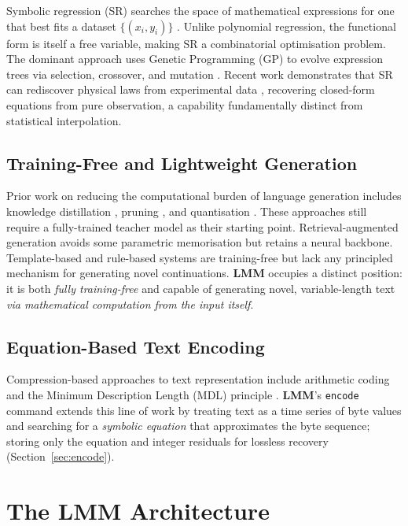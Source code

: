 \documentclass[11pt,a4paper]{article}
\newcommand{\lmm}{\texorpdfstring{%
  \textbf{\color{lmmAccent}LMM}}{LMM}}
\begin{document}
Symbolic regression (SR) searches the space of mathematical expressions for one that best fits a dataset $\{(x_i, y_i)\}$ \citep{koza1992genetic}. Unlike polynomial regression, the functional form is itself a free variable, making SR a combinatorial optimisation problem. The dominant approach uses Genetic Programming (GP) to evolve expression trees via selection, crossover, and mutation \citep{koza1992genetic,schmidt2009distilling}. Recent work demonstrates that SR can rediscover physical laws from experimental data \citep{udrescu2020ai,cranmer2020discovering}, recovering closed-form equations from pure observation, a capability fundamentally distinct from statistical interpolation.

\subsection{Training-Free and Lightweight Generation}

Prior work on reducing the computational burden of language generation includes knowledge distillation \citep{hinton2015distilling}, pruning \citep{han2015learning}, and quantisation \citep{dettmers2022llm}. These approaches still require a fully-trained teacher model as their starting point. Retrieval-augmented generation \citep{lewis2020retrieval} avoids some parametric memorisation but retains a neural backbone. Template-based and rule-based systems \citep{reiter1997building} are training-free but lack any principled mechanism for generating novel continuations. \lmm{} occupies a distinct position: it is both \emph{fully training-free} and capable of generating novel, variable-length text \emph{via mathematical computation from the input itself}.

\subsection{Equation-Based Text Encoding}

Compression-based approaches to text representation include arithmetic coding \citep{rissanen1976generalized} and the Minimum Description Length (MDL) principle \citep{rissanen1978modeling}. \lmm{}'s \texttt{encode} command extends this line of work by treating text as a time series of byte values and searching for a \emph{symbolic equation} that approximates the byte sequence; storing only the equation and integer residuals for lossless recovery (Section~\ref{sec:encode}).

\section{The \lmm{} Architecture}
\label{sec:arch}
\end{document}
